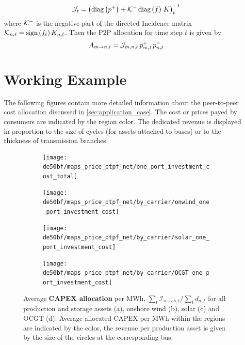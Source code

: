 \documentclass[11pt,twocolumn]{article}
\newcommand{\demand}[1][n]{d_{#1,t}}
\newcommand{\netconsumption}[1][n]{p^{-}_{#1,t}}
\newcommand{\netproduction}[1][n]{p^{+}_{#1,t}}
\newcommand{\incidence}[1][n]{K_{#1,\ell}}
\newcommand{\allocatepeer}[1][m \rightarrow n]{A_{#1,t}}
\newcommand{\allocatecapex}[1][n \rightarrow s,t]{\mathcal{I}_{#1}}
\begin{document}
\begin{align}
\mathcal{J}_t = \left( \operatorname{diag}\left(p^+\right) + \mathcal{K}^- \operatorname{diag}\left(f\right) \, K \right)_t^{-1} 
\end{align}
where $\mathcal{K}^-$ is the negative part of the directed Incidence matrix $\DirectedIncidence_{n,\ell} = \text{sign}\left( f_\ell \right)  \incidence$. Then the P2P allocation for time step $t$ is given by
\begin{align}
\allocatepeer = \InverseAPInjection_{m,n,t} \, \netproduction[m] \, \netconsumption
\end{align}

\section{Working Example}
The following figures contain more detailed information about the peer-to-peer cost allocation discussed in \cref{sec:application_case}. The cost or prices payed by consumers are indicated by the region color. The dedicated revenue is displayed in proportion to the size of cycles (for assets attached to buses) or to the thickness of transmission branches.    
\begin{figure}
    \centering
    \begin{subfigure}[c]{.49\linewidth}
        \texttt{[image: de50bf/maps\_price\_ptpf\_net/one\_port\_investment\_cost\_total]}
        \label{fig:total_capex}
    \end{subfigure}
    \begin{subfigure}[c]{.49\linewidth}
        \texttt{[image: de50bf/maps\_price\_ptpf\_net/by\_carrier/onwind\_one\_port\_investment\_cost]}
        \label{fig:onshore_capex}
    \end{subfigure}
    \begin{subfigure}[c]{.49\linewidth}
        \texttt{[image: de50bf/maps\_price\_ptpf\_net/by\_carrier/solar\_one\_port\_investment\_cost]}
        \label{fig:solar_capex}
    \end{subfigure}
    \begin{subfigure}[c]{.49\linewidth}
        \texttt{[image: de50bf/maps\_price\_ptpf\_net/by\_carrier/OCGT\_one\_port\_investment\_cost]}
        \label{fig:ocgt_capex}
    \end{subfigure}
    \caption{Average \textbf{CAPEX allocation} per MWh, $\sum_t \allocatecapex / \sum_t \demand$  for all production and storage assets (a), onshore wind (b), solar (c) and OCGT (d). Average allocated CAPEX per MWh within the regions are indicated by the color, the revenue per production asset is given by the size of the circles at the corresponding bus.}
    \label{fig:capex_price}
\end{figure}
\end{document}
